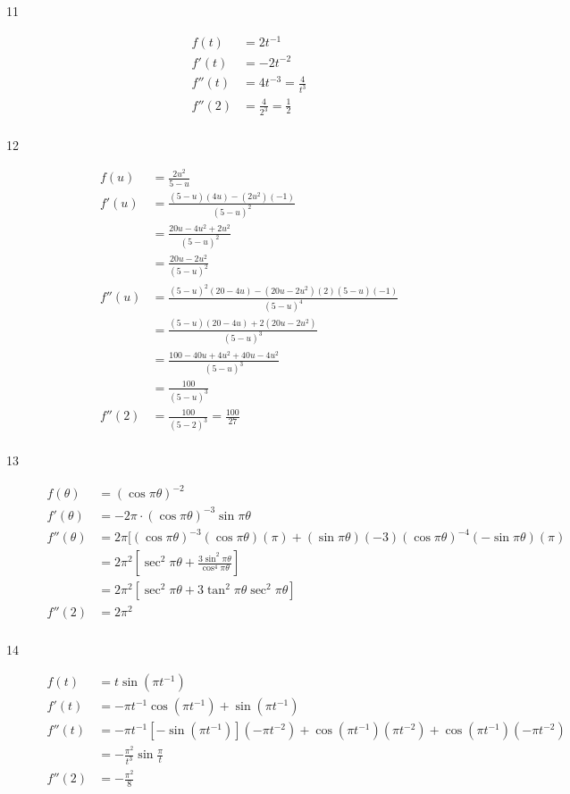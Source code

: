 \documentclass{exam}
\begin{document}
\begin{description}
\item[11]
\begin{align*}
  f(t)   &= 2t^{-1} \\
  f'(t)  &= -2t^{-2} \\
  f''(t) &= 4t^{-3} = \frac{4}{t^3} \\
  f''(2) &= \frac{4}{2^3} = \frac{1}{2} \\ 
\end{align*}

\item[12]
\begin{align*}
  f(u)   &=  \frac{2u^2}{5-u} \\
  f'(u)  &=  \frac{(5-u)(4u) - (2u^2)(-1)}{(5-u)^2} \\
         &=  \frac{20u -4u^2 + 2u^2}{(5-u)^2} \\
         &=  \frac{20u - 2u^2}{(5-u)^2} \\
  f''(u) &=  \frac{(5-u)^2(20-4u) - (20u - 2u^2)(2)(5-u)(-1)}{(5-u)^4} \\
         &=  \frac{(5-u)(20-4u) + 2(20u - 2u^2)}{(5-u)^3} \\
         &=  \frac{100 - 40u + 4u^2 + 40u - 4u^2}{(5-u)^3} \\
         &=  \frac{100}{(5-u)^3} \\
  f''(2) &=  \frac{100}{(5-2)^3} = \frac{100}{27} \\
\end{align*}

\item[13]
\begin{align*}
  f(\theta)   &= (\cos \pi \theta)^{-2} \\
  f'(\theta)  &= -2 \pi \cdot (\cos \pi \theta)^{-3} \sin \pi \theta \\
  f''(\theta) &= 2 \pi [ (\cos \pi \theta)^{-3}(\cos \pi \theta)(\pi) + (\sin \pi \theta)(-3)(\cos \pi \theta)^{-4}(- \sin \pi \theta)(\pi) \\
              &= 2 \pi^2 \left[ \sec^2 \pi \theta + \frac{3 \sin^2 \pi \theta}{\cos^4 \pi \theta} \right] \\
              &= 2 \pi^2 \left[ \sec^2 \pi \theta + 3 \tan^2 \pi \theta \sec^2 \pi \theta \right] \\
  f''(2)      &= 2 \pi^2 \\
\end{align*}

\item[14]
\begin{align*}
  f(t)   &= t \sin(\pi t^{-1}) \\
  f'(t)  &= - \pi t^{-1} \cos(\pi t^{-1}) + \sin(\pi t^{-1}) \\
  f''(t) &= - \pi t^{-1} [- \sin(\pi t^{-1})] (- \pi t^{-2}) + \cos(\pi t^{-1})(\pi t^{-2}) + \cos(\pi t^{-1}) (- \pi t^{-2}) \\
         &= - \frac{\pi^2}{t^3} \sin \frac{\pi}{t} \\
  f''(2) &= - \frac{\pi^2}{8} \\  
\end{align*}


\end{description}
\end{document}
